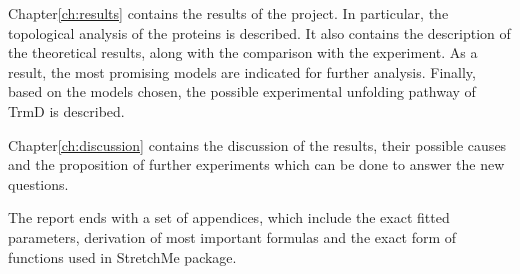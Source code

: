 Chapter\ref{ch:results} contains the results of the project.
In particular, the topological analysis of the proteins is described.
It also contains the description of the theoretical results, along with the comparison with the experiment.
As a result, the most promising models are indicated for further analysis.
Finally, based on the models chosen, the possible experimental unfolding pathway of TrmD is described.

Chapter\ref{ch:discussion} contains the discussion of the results, their possible causes and the proposition of further experiments which can be done to answer the new questions.

The report ends with a set of appendices, which include the exact fitted parameters, derivation of most important formulas and the exact form of functions used in StretchMe package.